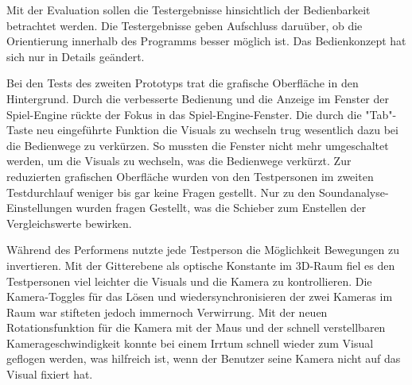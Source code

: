 

Mit der Evaluation sollen die Testergebnisse hinsichtlich der Bedienbarkeit betrachtet werden. Die Testergebnisse geben Aufschluss daru\"uber,
ob die Orientierung innerhalb des Programms besser m\"oglich ist. Das Bedienkonzept hat sich nur in Details ge\"andert.

Bei den Tests des zweiten Prototyps trat die grafische Oberfl\"ache in den Hintergrund. Durch die verbesserte Bedienung und die Anzeige im Fenster der
Spiel-Engine r\"uckte der Fokus in das Spiel-Engine-Fenster.
Die durch die "Tab"-Taste neu eingef\"uhrte Funktion die Visuals zu wechseln trug wesentlich dazu
bei die Bedienwege zu verk\"urzen. So mussten die Fenster nicht mehr umgeschaltet werden, um die Visuals zu wechseln, was die Bedienwege verk\"urzt.
Zur reduzierten grafischen Oberfl\"ache wurden von den Testpersonen im zweiten Testdurchlauf
weniger bis gar keine Fragen gestellt. Nur zu den Soundanalyse-Einstellungen wurden fragen Gestellt, was die Schieber zum Enstellen der Vergleichswerte
bewirken.

W\"ahrend des Performens nutzte jede Testperson die M\"oglichkeit Bewegungen zu invertieren. Mit der Gitterebene als optische Konstante im 3D-Raum fiel
es den Testpersonen viel leichter die Visuals und die Kamera zu kontrollieren. Die Kamera-Toggles f\"ur das L\"osen und wiedersynchronisieren der zwei
Kameras im Raum war stifteten jedoch immernoch Verwirrung. Mit der neuen Rotationsfunktion f\"ur die Kamera mit der Maus und der schnell verstellbaren
Kamerageschwindigkeit konnte bei einem Irrtum schnell wieder zum Visual geflogen werden, was hilfreich ist, wenn der Benutzer seine Kamera nicht auf das
Visual fixiert hat.

